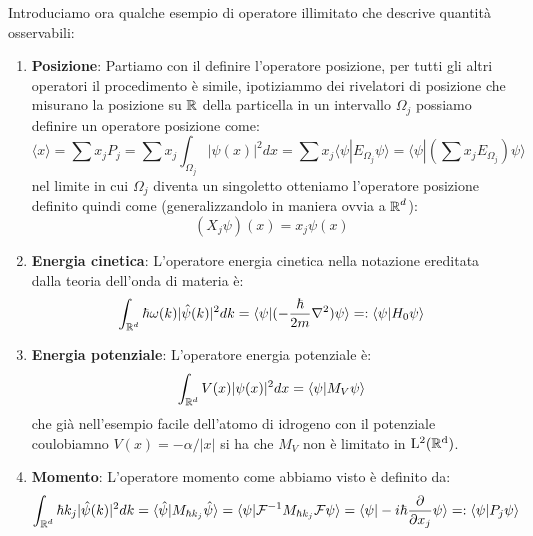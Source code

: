 \begin{example}
Introduciamo ora qualche esempio di operatore illimitato che descrive quantità osservabili:
    \begin{enumerate}
        \item \textbf{Posizione}: Partiamo con il definire l'operatore posizione, per tutti gli altri operatori il procedimento è simile, ipotiziammo dei rivelatori di posizione che misurano la posizione su $\operatorname{\mathbb{R}}$  della particella in un intervallo $\Omega_j$ possiamo definire un operatore posizione come: 
            $$ \langle x \rangle = \sum x_j P_j = \sum x_j \int_{\Omega_j} | \psi(x)|^2 dx = \sum x_j \langle \psi | E_{\Omega_j} \psi \rangle = \langle \psi | (\sum x_j E_{\Omega_j}) \psi \rangle$$ 
        nel limite in cui $\Omega_j$ diventa un singoletto otteniamo l'operatore posizione definito quindi come (generalizzandolo in maniera ovvia a $\operatorname{\mathbb{R}}^d$): 
        $$(X_j \psi) (x) = x_j \psi(x)$$
        \item \textbf{Energia cinetica}: L'operatore energia cinetica nella notazione ereditata dalla teoria dell'onda di materia è: 
            $$ \int_{\operatorname{\mathbb{R}}^d} \hbar \omega(k) | \hat{\psi}(k)|^2 dk= \langle \psi |(- \dfrac{\hbar}{2m} \nabla^2) \psi \rangle =: \langle \psi | H_0 \psi \rangle$$
        \item \textbf{Energia potenziale}: L'operatore energia potenziale è: 
            $$\int_{\operatorname{\mathbb{R}}^d} V(x) | \psi(x)|^2 dx = \langle \psi | M_V \psi \rangle$$ 
        che già nell'esempio facile dell'atomo di idrogeno con il potenziale coulobiamno $V(x) = - \alpha / |x|$ si ha che $M_V$ non è limitato in $\operatorname{L^2(\mathbb{R}^d)}$.
        \item \textbf{Momento}: L'operatore momento come abbiamo visto è definito da: 
            $$ \int_{\operatorname{\mathbb{R}}^d} \hbar k_j | \hat{\psi}(k)|^2 dk = \langle \hat{\psi} | M_{\hbar k_j} \hat{\psi} \rangle = \langle \psi | \mathcal{F}^{-1} M_{\hbar k_j} \mathcal{F} \psi \rangle = \langle \psi | - i \hbar \dfrac{\partial}{\partial x_j} \psi \rangle =: \langle \psi | P_j \psi \rangle$$
    \end{enumerate}
\end{example}



